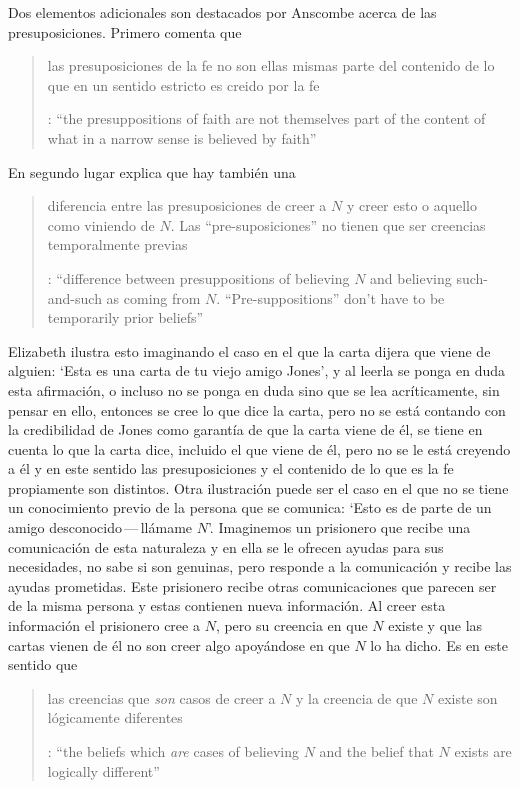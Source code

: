 Dos elementos adicionales son destacados por Anscombe acerca de las presuposiciones. Primero comenta que \blockquote[{\cite[117]{anscombe1981erp:faith}}: \enquote{the presuppositions of faith are not themselves part of the content of what in a narrow sense is believed by faith}]{las presuposiciones de la fe no son ellas mismas parte del contenido de lo que en un sentido estricto es creido por la fe}. En segundo lugar explica que hay también una \blockquote[{\cite[118]{anscombe1981erp:faith}}: \enquote{difference between presuppositions of believing $N$ and believing such-and-such as coming from $N$. ``Pre-suppositions'' don't have to be temporarily prior beliefs}]{diferencia entre las presuposiciones de creer a $N$ y creer esto o aquello como viniendo de $N$. Las ``pre-suposiciones'' no tienen que ser creencias temporalmente previas}. Elizabeth ilustra esto imaginando el caso en el que la carta dijera que viene de alguien: \enquote*{Esta es una carta de tu viejo amigo Jones}, y al leerla se ponga en duda esta afirmación, o incluso no se ponga en duda sino que se lea acríticamente, sin pensar en ello, entonces se cree lo que dice la carta, pero no se está contando con la credibilidad de Jones como garantía de que la carta viene de él, se tiene en cuenta lo que la carta dice, incluido el que viene de él, pero no se le está creyendo a él y en este sentido las presuposiciones y el contenido de lo que es la fe propiamente son distintos. Otra ilustración puede ser el caso en el que no se tiene un conocimiento previo de la persona que se comunica: \enquote*{Esto es de parte de un amigo desconocido\,---\,llámame $N$}. Imaginemos un prisionero que recibe una comunicación de esta naturaleza y en ella se le ofrecen ayudas para sus necesidades, no sabe si son genuinas, pero responde a la comunicación y recibe las ayudas prometidas. Este prisionero recibe otras comunicaciones que parecen ser de la misma persona y estas contienen nueva información. Al creer esta información el prisionero cree a $N$, pero su creencia en que $N$ existe y que las cartas vienen de él no son creer algo apoyándose en que $N$ lo ha dicho. Es en este sentido que \blockquote[{\cite[118]{anscombe1981erp:faith}}: \enquote{the beliefs which \emph{are} cases of believing $N$ and the belief that $N$ exists are logically different}]{las creencias que \emph{son} casos de creer a $N$ y la creencia de que $N$ existe son lógicamente diferentes}.

